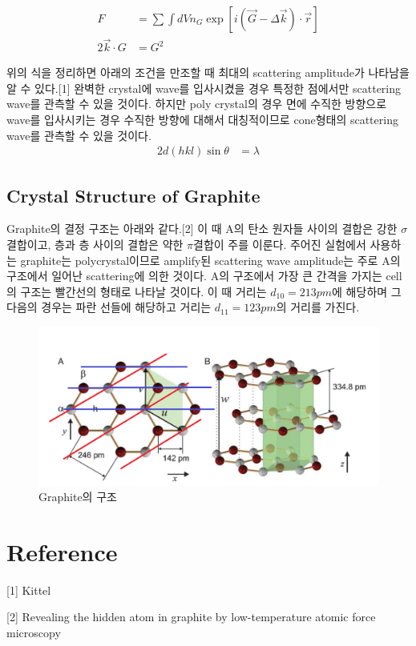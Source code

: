 \documentclass[%
 reprint,
 amsmath,amssymb,
 aps,
]{revtex4-2}
\begin{document}
\begin{align}
	F &= \sum \int dV n_{G}\exp[i(\vec{G}-\Delta\vec{k})\cdot \vec{r}]\\
	2\vec{k}\cdot{G} &= G^{2}
\end{align}

위의 식을 정리하면 아래의 조건을 만조할 때 최대의 scattering amplitude가 나타남을 알 수 있다.[1] 완벽한 crystal에 wave를 입사시켰을 경우 특정한 점에서만 scattering wave를 관측할 수 있을 것이다. 하지만 poly crystal의 경우 면에 수직한 방향으로 wave를 입사시키는 경우 수직한 방향에 대해서 대칭적이므로 cone형태의 scattering wave를 관측할 수 있을 것이다.
\begin{align}
	2d(hkl) \sin \theta &= \lambda
\end{align}

\subsection{\label{sec:level2}Crystal Structure of Graphite}
Graphite의 결정 구조는 아래와 같다.[2] 이 때 A의 탄소 원자들 사이의 결합은 강한 $\sigma$ 결합이고, 층과 층 사이의 결합은 약한 $\pi$결합이 주를 이룬다. 주어진 실험에서 사용하는 graphite는 polycrystal이므로 amplify된 scattering wave amplitude는 주로 A의 구조에서 일어난 scattering에 의한 것이다. A의 구조에서 가장 큰 간격을 가지는 cell의 구조는 빨간선의 형태로 나타날 것이다. 이 때 거리는 $d_{10} = 213pm$에 해당하며 그다음의 경우는 파란 선들에 해당하고 거리는 $d_{11} = 123pm$의 거리를 가진다.

\begin{figure}[htbp]
	\includegraphics[width = 0.95\linewidth]{Graphite.png}%
	\caption{\label{fig:Graphite}Graphite의 구조}
\end{figure}

\section{\label{sec:level1}Reference}
[1] Kittel

[2] Revealing the hidden atom in graphite by low-temperature atomic force microscopy
\end{document}
